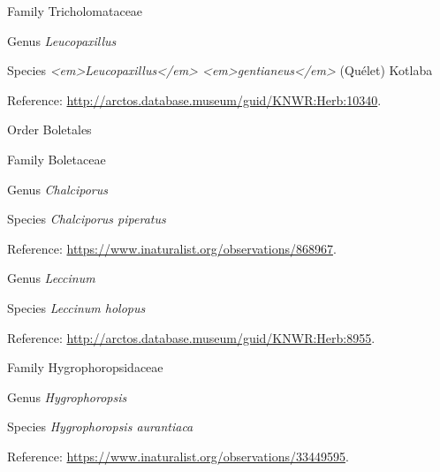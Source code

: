 \documentclass[9pt, article]{memoir}
\begin{document}
\begin{multicols}{2}
\vspace{6pt}\noindent\hspace{24pt}Family Tricholomataceae


\vspace{6pt}\noindent\hspace{30pt}Genus \textit{Leucopaxillus}


\vspace{6pt}\noindent\hspace{36pt}Species \textit{<em>Leucopaxillus</em> <em>gentianeus</em>} (Quélet) Kotlaba


Reference: 
\url{http://arctos.database.museum/guid/KNWR:Herb:10340}.

\vspace{6pt}\noindent\hspace{18pt}Order Boletales


\vspace{6pt}\noindent\hspace{24pt}Family Boletaceae


\vspace{6pt}\noindent\hspace{30pt}Genus \textit{Chalciporus}


\vspace{6pt}\noindent\hspace{36pt}Species \textit{Chalciporus piperatus}


Reference: 
\url{https://www.inaturalist.org/observations/868967}.

\vspace{6pt}\noindent\hspace{30pt}Genus \textit{Leccinum}


\vspace{6pt}\noindent\hspace{36pt}Species \textit{Leccinum holopus}


Reference: 
\url{http://arctos.database.museum/guid/KNWR:Herb:8955}.

\vspace{6pt}\noindent\hspace{24pt}Family Hygrophoropsidaceae


\vspace{6pt}\noindent\hspace{30pt}Genus \textit{Hygrophoropsis}


\vspace{6pt}\noindent\hspace{36pt}Species \textit{Hygrophoropsis aurantiaca}


Reference: 
\url{https://www.inaturalist.org/observations/33449595}.


\end{multicols}
\end{document}
